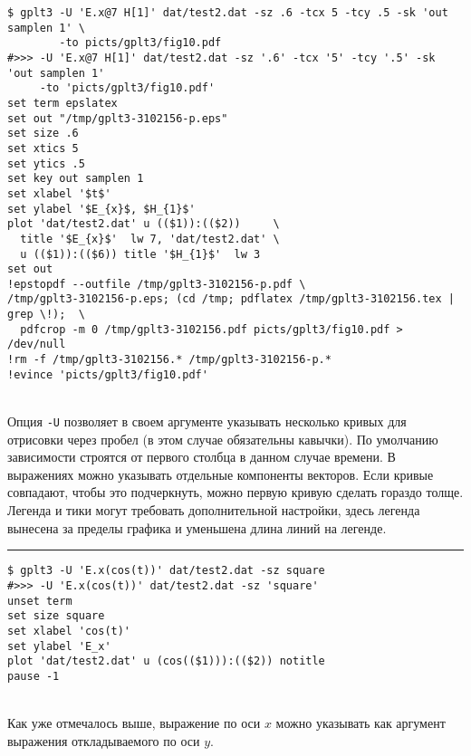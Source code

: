 \documentclass[12pt]{article}
\begin{document}
\vspace{3mm}
\noindent
\begin{minipage}[b]{.48\textwidth}
\small
\begin{verbatim}
$ gplt3 -U 'E.x@7 H[1]' dat/test2.dat -sz .6 -tcx 5 -tcy .5 -sk 'out samplen 1' \
        -to picts/gplt3/fig10.pdf
#>>> -U 'E.x@7 H[1]' dat/test2.dat -sz '.6' -tcx '5' -tcy '.5' -sk 'out samplen 1' 
     -to 'picts/gplt3/fig10.pdf'
set term epslatex 
set out "/tmp/gplt3-3102156-p.eps"
set size .6
set xtics 5
set ytics .5
set key out samplen 1
set xlabel '$t$'
set ylabel '$E_{x}$, $H_{1}$'
plot 'dat/test2.dat' u (($1)):(($2))     \
  title '$E_{x}$'  lw 7, 'dat/test2.dat' \
  u (($1)):(($6)) title '$H_{1}$'  lw 3 
set out
!epstopdf --outfile /tmp/gplt3-3102156-p.pdf \
/tmp/gplt3-3102156-p.eps; (cd /tmp; pdflatex /tmp/gplt3-3102156.tex | grep \!);  \
  pdfcrop -m 0 /tmp/gplt3-3102156.pdf picts/gplt3/fig10.pdf > /dev/null
!rm -f /tmp/gplt3-3102156.* /tmp/gplt3-3102156-p.*
!evince 'picts/gplt3/fig10.pdf'
\end{verbatim}
\end{minipage}
\raisebox{2cm}{\epsfig{file=picts/gplt3/fig10, width=.5\textwidth}}\\[5mm]
Опция \verb'-U' позволяет в своем аргументе указывать несколько кривых для отрисовки через пробел (в этом случае обязательны кавычки).
По умолчанию зависимости строятся от первого столбца в данном случае времени. В выражениях можно указывать отдельные компоненты векторов.
Если кривые совпадают, чтобы это подчеркнуть, можно первую кривую сделать гораздо толще.
Легенда и тики могут требовать дополнительной настройки, здесь легенда вынесена за пределы графика и уменьшена длина линий на легенде.\\

\hrule %

\vspace{3mm}
\noindent
\begin{minipage}[b]{.73\textwidth}
\small
\begin{verbatim}
$ gplt3 -U 'E.x(cos(t))' dat/test2.dat -sz square
#>>> -U 'E.x(cos(t))' dat/test2.dat -sz 'square'
unset term
set size square
set xlabel 'cos(t)'
set ylabel 'E_x'
plot 'dat/test2.dat' u (cos(($1))):(($2)) notitle   
pause -1
\end{verbatim}
\end{minipage}
\\[5mm]
Как уже отмечалось выше, выражение по оси $x$  можно указывать как аргумент выражения откладываемого по оси $y$.
\end{document}
